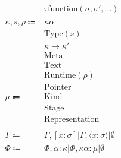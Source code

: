 \documentclass {article}
\begin{document}
\begin{align*}
& \tau \text{function}(\sigma, \sigma', \dots) \tag*{[Function Literal Type]} \\
\\
\kappa, s, \rho \Coloneqq &  \kappa \alpha \tag*{[Kind Variable]} \\
& \text{Type} (s) \tag*{[Type]} \\
& \kappa \to \kappa' \tag*{[Higher Kinded Type]} \\
& \text{Meta} \tag*{[Meta Stage]}\\
& \text{Text} \tag*{[Symbol Stage]} \\
& \text{Runtime} (\rho) \tag*{[Runtime Stage]}\\
& \text{Pointer} \tag*{[Pointer Representation]}\\
\mu \Coloneqq & \text{Kind} \\
& \text{Stage} \\
& \text{Representation} \\
\\
\Gamma \Coloneqq & \Gamma, [x : \sigma] | \Gamma, \langle x : \sigma \rangle | \emptyset \\
\Phi \Coloneqq & \Phi, \alpha : \kappa | \Phi, \kappa \alpha : \mu |  \emptyset \\
\end{align*}
\end{document}
